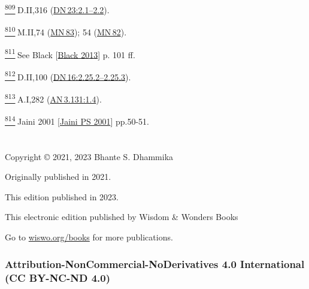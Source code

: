 \label{footprints_split_025.html_fn809}
\hyperref[footprints_split_020.htmlux5cux23fnref809]{\textsuperscript{809}} D.II,316
(\href{https://suttacentral.net/dn23/en/sujato\#2.1}{DN\,23:2.1--2.2}).

\label{footprints_split_025.html_fn810}
\hyperref[footprints_split_020.htmlux5cux23fnref810]{\textsuperscript{810}} M.II,74
(\href{https://suttacentral.net/mn83/en/sujato}{MN\,83}); 54
(\href{https://suttacentral.net/mn82/en/sujato}{MN\,82}).

\label{footprints_split_025.html_fn811}
\hyperref[footprints_split_020.htmlux5cux23fnref811]{\textsuperscript{811}} See
{Black
{{[}\hyperref[footprints_split_022.htmlux5cux23Blackux5cux25202013]{Black
2013}{]}}} p. 101 ff.

\label{footprints_split_025.html_fn812}
\hyperref[footprints_split_020.htmlux5cux23fnref812]{\textsuperscript{812}} D.II,100
(\href{https://suttacentral.net/dn16/en/sujato\#2.25.2}{DN\,16:2.25.2--2.25.3}).

\label{footprints_split_025.html_fn813}
\hyperref[footprints_split_020.htmlux5cux23fnref813]{\textsuperscript{813}} A.I,282
(\href{https://suttacentral.net/an3.131/en/sujato\#1.4}{AN\,3.131:1.4}).

\label{footprints_split_025.html_fn814}
\hyperref[footprints_split_020.htmlux5cux23fnref814]{\textsuperscript{814}} {Jaini
2001
{{[}\hyperref[footprints_split_022.htmlux5cux23Jainiux5cux2520PSux5cux25202001]{Jaini
PS 2001}{]}}} pp.50-51.

\label{footprints_split_025.html_calibre_pb_49}

\label{footprints_split_026.html}{}

\section{}\label{footprints_split_026.html_calibre_toc_27}

Copyright © 2021, 2023 Bhante S. Dhammika

Originally published in 2021.

This edition published in 2023.

This electronic edition published by Wisdom \& Wonders Books

Go to \href{https://wiswo.org/books}{wiswo.org/books} for more
publications.

\subsubsection{\texorpdfstring{Attribution-NonCommercial-NoDerivatives
4.0 International {(CC BY-NC-ND
4.0)}}{Attribution-NonCommercial-NoDerivatives 4.0 International (CC BY-NC-ND 4.0)}}

